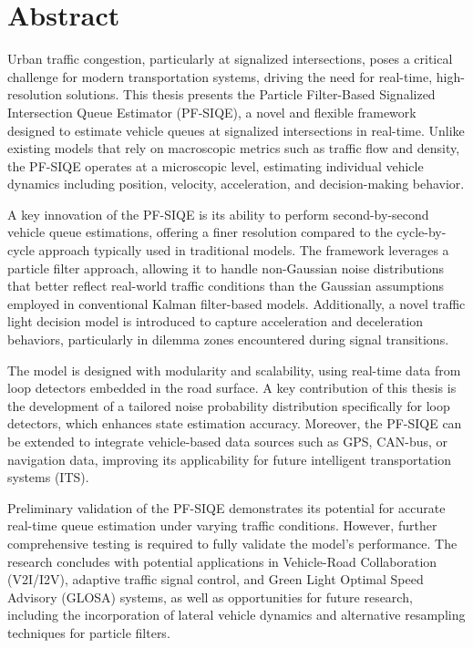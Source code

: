 \chapter*{Abstract}

\emph{}

Urban traffic congestion, particularly at signalized intersections, poses a critical challenge for modern transportation systems, driving the need for real-time, high-resolution solutions. This thesis presents the Particle Filter-Based Signalized Intersection Queue Estimator (PF-SIQE), a novel and flexible framework designed to estimate vehicle queues at signalized intersections in real-time. Unlike existing models that rely on macroscopic metrics such as traffic flow and density, the PF-SIQE operates at a microscopic level, estimating individual vehicle dynamics including position, velocity, acceleration, and decision-making behavior.

A key innovation of the PF-SIQE is its ability to perform second-by-second vehicle queue estimations, offering a finer resolution compared to the cycle-by-cycle approach typically used in traditional models. The framework leverages a particle filter approach, allowing it to handle non-Gaussian noise distributions that better reflect real-world traffic conditions than the Gaussian assumptions employed in conventional Kalman filter-based models. Additionally, a novel traffic light decision model is introduced to capture acceleration and deceleration behaviors, particularly in dilemma zones encountered during signal transitions.

The model is designed with modularity and scalability, using real-time data from loop detectors embedded in the road surface. A key contribution of this thesis is the development of a tailored noise probability distribution specifically for loop detectors, which enhances state estimation accuracy. Moreover, the PF-SIQE can be extended to integrate vehicle-based data sources such as GPS, CAN-bus, or navigation data, improving its applicability for future intelligent transportation systems (ITS).

Preliminary validation of the PF-SIQE demonstrates its potential for accurate real-time queue estimation under varying traffic conditions. However, further comprehensive testing is required to fully validate the model’s performance. The research concludes with potential applications in Vehicle-Road Collaboration (V2I/I2V), adaptive traffic signal control, and Green Light Optimal Speed Advisory (GLOSA) systems, as well as opportunities for future research, including the incorporation of lateral vehicle dynamics and alternative resampling techniques for particle filters.


